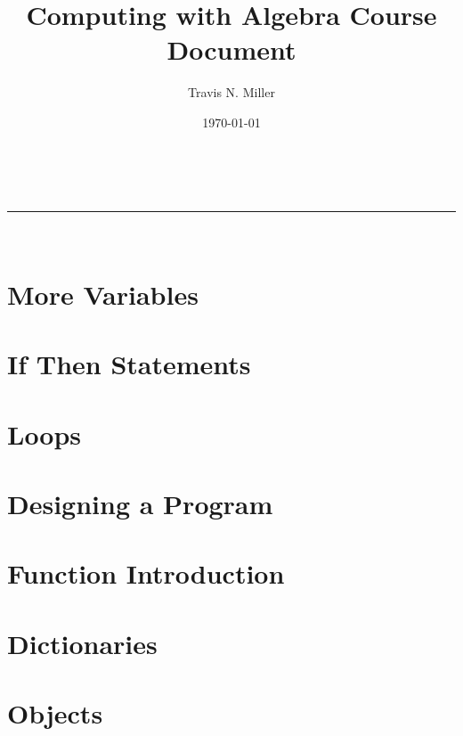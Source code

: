 \documentclass[a4paper,11pt]{article}
\makeatletter
\newcommand{\linia}{\rule{\linewidth}{0.5pt}}
\renewcommand{\maketitle}{
\begin{center}
\vspace{2ex}
{\huge \textsc{\@title}}
\vspace{1ex}
\\
\linia\\
\@author \hfill \@date
\vspace{4ex}
\end{center}
}
\makeatother
\begin{document}
\title{Computing with Algebra Course Document}

\author{Travis N. Miller}

\date{\today}

\maketitle

\section*{More Variables}


\section*{If Then Statements}


\section*{Loops}


\section*{Designing a Program}


\section*{Function Introduction}


\section*{Dictionaries}


\section*{Objects}

\end{document}
